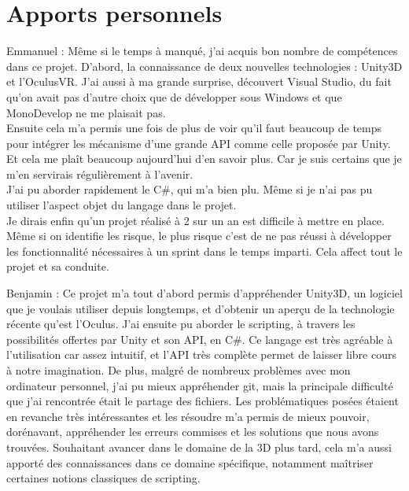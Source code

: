 \documentclass[a4paper,11pt]{myreport}
\begin{document}
\chapter{Apports personnels}
\par Emmanuel : Même si le temps à manqué, j'ai acquis bon nombre de compétences dans ce projet. D'abord, la connaissance de deux nouvelles technologies : Unity3D et l'OculusVR. J'ai aussi à ma grande surprise, découvert Visual Studio, du fait qu'on avait pas d'autre choix que de développer sous Windows et que MonoDevelop ne me plaisait pas.\\
Ensuite cela m'a permis une fois de plus de voir qu'il faut beaucoup de temps pour intégrer les mécanisme d'une grande API comme celle proposée par Unity. Et cela me plaît beaucoup aujourd'hui d'en savoir plus. Car je suis certains que je m'en servirais régulièrement à l'avenir.\\
J'ai pu aborder rapidement le C\#, qui m'a bien plu. Même si je n'ai pas pu utiliser l'aspect objet du langage dans le projet.\\
Je dirais enfin qu'un projet réalisé à 2 sur un an est difficile à mettre en place. Même si on identifie les risque, le plus risque c'est de ne pas réussi à développer les fonctionnalité nécessaires à un sprint dans le temps imparti. Cela affect tout le projet et sa conduite.
\par Benjamin : Ce projet m'a tout d'abord permis d'appréhender Unity3D, un logiciel que je voulais utiliser depuis longtemps, et d'obtenir un aperçu de la technologie récente qu'est l'Oculus. J'ai ensuite pu aborder le scripting, à travers les possibilités offertes par Unity et son API, en C\#. Ce langage est très agréable à l'utilisation car assez intuitif, et l'API très complète permet de laisser libre cours à notre imagination.
De plus, malgré de nombreux problèmes avec mon ordinateur personnel, j'ai pu mieux appréhender git, mais la principale difficulté que j'ai rencontrée était le partage des fichiers.
Les problématiques posées étaient en revanche très intéressantes et les résoudre m'a permis de mieux pouvoir, dorénavant, appréhender les erreurs commises et les solutions que nous avons trouvées.
Souhaitant avancer dans le domaine de la 3D plus tard, cela m'a aussi apporté des connaissances dans ce domaine spécifique, notamment maîtriser certaines notions classiques de scripting. 


\listoffigures
\end{document}
